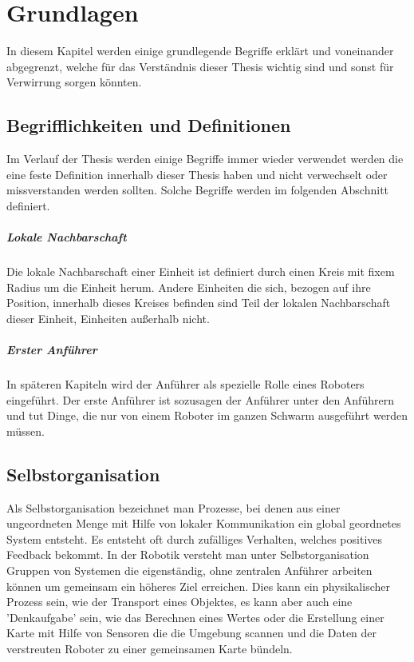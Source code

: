 \chapter{Grundlagen}\label{ch:Grundlagen}

In diesem Kapitel werden einige grundlegende Begriffe erklärt und voneinander abgegrenzt, welche für das Verständnis dieser Thesis wichtig sind und sonst für Verwirrung sorgen könnten.

\section{Begrifflichkeiten und Definitionen}\label{Definitionen}

Im Verlauf der Thesis werden einige Begriffe immer wieder verwendet werden die eine feste Definition innerhalb dieser Thesis haben und nicht verwechselt oder missverstanden werden sollten. Solche Begriffe werden im folgenden Abschnitt definiert.

\paragraph*{Lokale Nachbarschaft}
Die lokale Nachbarschaft einer Einheit ist definiert durch einen Kreis mit fixem Radius um die Einheit herum. Andere Einheiten die sich, bezogen auf ihre Position, innerhalb dieses Kreises befinden sind Teil der lokalen Nachbarschaft dieser Einheit, Einheiten außerhalb nicht.

\paragraph*{Erster Anführer}
In späteren Kapiteln wird der Anführer als spezielle Rolle eines Roboters eingeführt. Der erste Anführer ist sozusagen der Anführer unter den Anführern und tut Dinge, die nur von einem Roboter im ganzen Schwarm ausgeführt werden müssen.

\section{Selbstorganisation}\label{sec:Selbstorganisation}

Als Selbstorganisation bezeichnet man Prozesse, bei denen aus einer ungeordneten Menge mit Hilfe von lokaler Kommunikation ein global geordnetes System entsteht.
Es entsteht oft durch zufälliges Verhalten, welches positives Feedback bekommt.
In der Robotik versteht man unter Selbstorganisation Gruppen von Systemen die eigenständig, ohne zentralen Anführer arbeiten können um gemeinsam ein höheres Ziel erreichen. Dies kann ein physikalischer Prozess sein, wie der Transport eines Objektes, es kann aber auch eine 'Denkaufgabe' sein, wie das Berechnen eines Wertes oder die Erstellung einer Karte mit Hilfe von Sensoren die die Umgebung scannen und die Daten der verstreuten Roboter zu einer gemeinsamen Karte bündeln.

